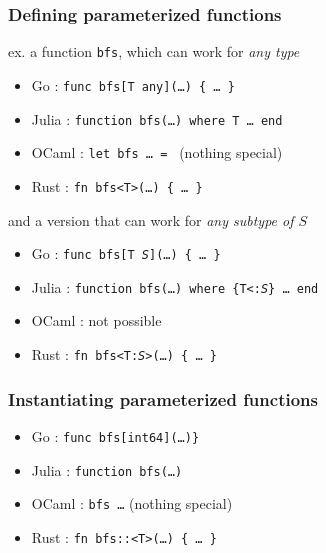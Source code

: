 \documentclass[12pt,dvipdfmx]{beamer}
\newcommand{\ao}[1]{{\color{blue}#1}}
\begin{document}
\begin{frame}
  \frametitle{Defining parameterized functions}
  ex. a function {\tt bfs}, which can work for {\it any type}
  \begin{itemize}
  \item Go : {\tt func bfs\ao{[T any]}(\ldots) \{ \ldots\ \}}
  \item Julia : {\tt function bfs(\ldots) \ao{where T} \ldots\ end}
  \item OCaml : {\tt let bfs \ldots\ = } (nothing special)
  \item Rust : {\tt fn bfs\ao{<T>}(\ldots) \{ \ldots\ \}}
  \end{itemize}
  and a version that can work for {\it any subtype of $S$}
  \begin{itemize}
  \item Go : {\tt func bfs\ao{[T {\it S}]}(\ldots) \{ \ldots\ \}}
  \item Julia : {\tt function bfs(\ldots) \ao{where \{T<:{\it S}\}} \ldots\ end}
  \item OCaml : not possible 
  \item Rust : {\tt fn bfs\ao{<T:{\it S}>}(\ldots) \{ \ldots\ \}}
  \end{itemize}
\end{frame}

\begin{frame}
  \frametitle{Instantiating parameterized functions}
  \begin{itemize}
  \item Go : {\tt func bfs\ao{[int64]}(\ldots)\}}
  \item Julia : {\tt function bfs(\ldots)}
  \item OCaml : {\tt bfs \ldots} (nothing special)
  \item Rust : {\tt fn bfs\ao{::<T>}(\ldots) \{ \ldots\ \}}
  \end{itemize}
\end{frame}
\end{document}
